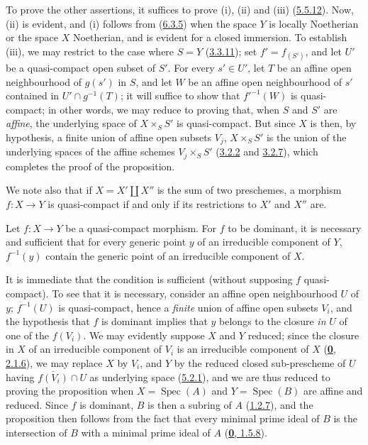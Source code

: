 To prove the other assertions, it suffices to prove (i), (ii) and (iii)
(\hyperref[I.5.5.12]{5.5.12}). Now, (ii) is evident, and (i) follows from
(\hyperref[I.6.3.5]{6.3.5}) when the space $Y$ is locally Noetherian
or the space $X$ Noetherian, and is evident for a closed immersion. To
establish (iii),
we may restrict to the case where $S=Y$ (\hyperref[I.3.3.11]{3.3.11}); set
$f'=f_{(S')}$, and let $U'$ be a quasi-compact open subset of $S'$. For every
$s'\in U'$, let $T$ be an affine open neighbourhood of $g(s')$ in $S$, and let
$W$ be an affine open neighbourhood of $s'$ contained in
$U'\cap g^{-1}(T)$; it will suffice to show that $f'^{-1}(W)$ is
quasi-compact; in other words, we may reduce to proving that, when $S$
and $S'$ are \emph{affine}, the underlying space of $X\times_S S'$ is
quasi-compact. But since $X$ is then, by hypothesis, a finite union of affine
open subsets $V_j$, $X\times_S S'$ is the union of the underlying spaces of the
affine schemes $V_j\times_S S'$
(\hyperref[I.3.2.2]{3.2.2} and \hyperref[I.3.2.7]{3.2.7}), which
completes the proof of the proposition.

We note also that if $X=X'\amalg X''$ is the sum of two preschemes, a
morphism $f:X\to Y$ is quasi-compact if and only if its restrictions to
$X'$ and $X''$ are.

\begin{proposition}[6.6.5]
\label{I.6.6.5}
Let $f:X\to Y$ be a quasi-compact morphism. For $f$ to be dominant, it is
necessary and sufficient that for every generic point $y$ of an irreducible
component of $Y$, $f^{-1}(y)$ contain the generic point of an irreducible
component of $X$.
\end{proposition}

It is immediate that the condition is sufficient (without supposing $f$
quasi-compact). To see that it is necessary, consider an affine open
neighbourhood $U$ of $y$; $f^{-1}(U)$ is quasi-compact, hence a
\emph{finite} union of affine open subsets $V_i$, and the hypothesis that $f$ is
dominant implies that $y$ belongs to the closure \emph{in} $U$ of one of the
$f(V_i)$. We may evidently suppose $X$ and $Y$ reduced; since the closure in
$X$ of an irreducible component of $V_i$ is an irreducible component of $X$
(\hyperref[0.2.1.6]{\textbf{0}, 2.1.6}), we may replace $X$ by $V_i$, and $Y$ by
the reduced closed sub-prescheme of $U$ having $\overline{f(V_i)}\cap U$ as
underlying space (\hyperref[I.5.2.1]{5.2.1}), and we are thus reduced to
proving the proposition when $X=\operatorname{Spec}(A)$ and
$Y=\operatorname{Spec}(B)$ are affine and reduced. Since $f$ is dominant,
$B$ is then a subring of $A$ (\hyperref[I.1.2.7]{1.2.7}), and the
proposition then follows from the fact that every minimal prime ideal of $B$
is the intersection of $B$ with a minimal prime ideal of $A$
(\hyperref[0.1.5.8]{\textbf{0}, 1.5.8}).

